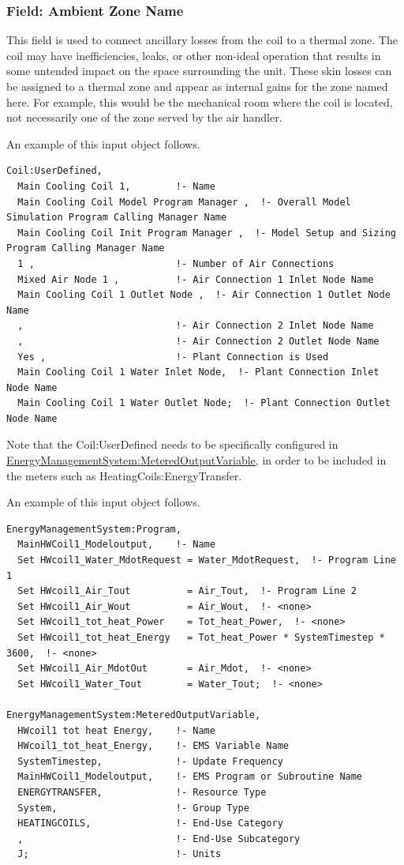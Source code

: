 \subsubsection{Field: Ambient Zone Name}\label{field-ambient-zone-name-2}

This field is used to connect ancillary losses from the coil to a thermal zone. The coil may have inefficiencies, leaks, or other non-ideal operation that results in some untended impact on the space surrounding the unit. These skin losses can be assigned to a thermal zone and appear as internal gains for the zone named here. For example, this would be the mechanical room where the coil is located, not necessarily one of the zone served by the air handler.

An example of this input object follows.

\begin{lstlisting}
Coil:UserDefined,
  Main Cooling Coil 1,        !- Name
  Main Cooling Coil Model Program Manager ,  !- Overall Model Simulation Program Calling Manager Name
  Main Cooling Coil Init Program Manager ,  !- Model Setup and Sizing Program Calling Manager Name
  1 ,                         !- Number of Air Connections
  Mixed Air Node 1 ,          !- Air Connection 1 Inlet Node Name
  Main Cooling Coil 1 Outlet Node ,  !- Air Connection 1 Outlet Node Name
  ,                           !- Air Connection 2 Inlet Node Name
  ,                           !- Air Connection 2 Outlet Node Name
  Yes ,                       !- Plant Connection is Used
  Main Cooling Coil 1 Water Inlet Node,  !- Plant Connection Inlet Node Name
  Main Cooling Coil 1 Water Outlet Node;  !- Plant Connection Outlet Node Name
\end{lstlisting}

Note that the Coil:UserDefined needs to be specifically configured in \hyperref[energymanagementsystemmeteredoutputvariable]{EnergyManagementSystem:MeteredOutputVariable}, in order to be included in the meters such as HeatingCoils:EnergyTransfer.

An example of this input object follows.

\begin{lstlisting}
EnergyManagementSystem:Program,
  MainHWCoil1_Modeloutput,    !- Name
  Set HWcoil1_Water_MdotRequest = Water_MdotRequest,  !- Program Line 1
  Set HWcoil1_Air_Tout          = Air_Tout,  !- Program Line 2
  Set HWcoil1_Air_Wout          = Air_Wout,  !- <none>
  Set HWcoil1_tot_heat_Power    = Tot_heat_Power,  !- <none>
  Set HWcoil1_tot_heat_Energy   = Tot_heat_Power * SystemTimestep * 3600,  !- <none>
  Set HWcoil1_Air_MdotOut       = Air_Mdot,  !- <none>
  Set HWcoil1_Water_Tout        = Water_Tout;  !- <none>

EnergyManagementSystem:MeteredOutputVariable,
  HWcoil1 tot heat Energy,    !- Name
  HWcoil1_tot_heat_Energy,    !- EMS Variable Name
  SystemTimestep,             !- Update Frequency
  MainHWCoil1_Modeloutput,    !- EMS Program or Subroutine Name
  ENERGYTRANSFER,             !- Resource Type
  System,                     !- Group Type
  HEATINGCOILS,               !- End-Use Category
  ,                           !- End-Use Subcategory
  J;                          !- Units
\end{lstlisting}

